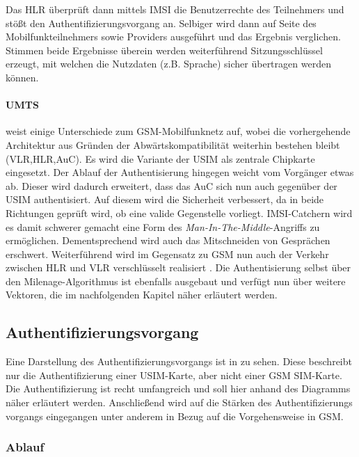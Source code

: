 Das \ac{HLR} überprüft dann mittels \ac{IMSI} die Benutzerrechte des Teilnehmers und
stößt den Authentifizierungsvorgang an. Selbiger wird dann auf Seite des
Mobilfunkteilnehmers sowie Providers ausgeführt und das Ergebnis verglichen.
Stimmen beide Ergebnisse überein werden weiterführend Sitzungsschlüssel erzeugt,
mit welchen die Nutzdaten (z.B. Sprache) sicher übertragen werden können.

\paragraph{UMTS} weist einige Unterschiede zum GSM-Mobilfunknetz auf, wobei die
vorhergehende Architektur aus Gründen der Abwärtskompatibilität weiterhin bestehen bleibt
(\ac{VLR},\ac{HLR},\ac{AuC}). Es wird die Variante der USIM als zentrale Chipkarte
eingesetzt. Der Ablauf der Authentisierung hingegen weicht vom Vorgänger etwas ab.
Dieser wird dadurch erweitert, dass das \ac{AuC} sich nun auch gegenüber der \ac{USIM}
authentisiert. Auf diesem wird die Sicherheit verbessert, da in beide Richtungen
geprüft wird, ob eine valide Gegenstelle vorliegt. \ac{IMSI}-Catchern wird es damit
schwerer gemacht eine Form des \textit{Man-In-The-Middle}-Angriffs zu ermöglichen.
Dementsprechend wird auch das Mitschneiden von Gesprächen erschwert. Weiterführend
wird im Gegensatz zu \ac{GSM} nun auch der Verkehr zwischen \ac{HLR} und \ac{VLR}
verschlüsselt realisiert \cite{spitz11}.
Die Authentisierung selbst über den Milenage-Algorithmus ist ebenfalls ausgebaut
und verfügt nun über weitere Vektoren, die im nachfolgenden Kapitel näher
erläutert werden.

\subsection{Authentifizierungsvorgang}
\label{authentifizierungsvorgang}

Eine Darstellung des Authentifizierungsvorgangs ist in  zu
sehen. Diese beschreibt nur die Authentifizierung einer \ac{USIM}-Karte, aber nicht einer
GSM \ac{SIM}-Karte. \\
Die Authentifizierung ist recht umfangreich und soll hier anhand des Diagramms näher
erläutert werden. Anschließend wird auf die Stärken des Authentifizierungs\-
vorgangs eingegangen unter anderem in Bezug auf die Vorgehensweise in GSM.

 \subsubsection{Ablauf}
 
